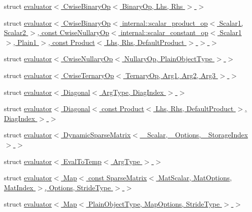 \begin{DoxyCompactItemize}
\item 
struct \hyperlink{struct_eigen_1_1internal_1_1evaluator_3_01_cwise_binary_op_3_01_binary_op_00_01_lhs_00_01_rhs_01_4_01_4}{evaluator$<$ Cwise\+Binary\+Op$<$ Binary\+Op, Lhs, Rhs $>$ $>$}
\item 
struct \hyperlink{struct_eigen_1_1internal_1_1evaluator_3_01_cwise_binary_op_3_01internal_1_1scalar__product__op_321f22566d2663743c7f9d1c3e4e03f69}{evaluator$<$ Cwise\+Binary\+Op$<$ internal\+::scalar\+\_\+product\+\_\+op$<$ Scalar1, Scalar2 $>$, const Cwise\+Nullary\+Op$<$ internal\+::scalar\+\_\+constant\+\_\+op$<$ Scalar1 $>$, Plain1 $>$, const Product$<$ Lhs, Rhs, Default\+Product $>$ $>$ $>$}
\item 
struct \hyperlink{struct_eigen_1_1internal_1_1evaluator_3_01_cwise_nullary_op_3_01_nullary_op_00_01_plain_object_type_01_4_01_4}{evaluator$<$ Cwise\+Nullary\+Op$<$ Nullary\+Op, Plain\+Object\+Type $>$ $>$}
\item 
struct \hyperlink{struct_eigen_1_1internal_1_1evaluator_3_01_cwise_ternary_op_3_01_ternary_op_00_01_arg1_00_01_arg2_00_01_arg3_01_4_01_4}{evaluator$<$ Cwise\+Ternary\+Op$<$ Ternary\+Op, Arg1, Arg2, Arg3 $>$ $>$}
\item 
struct \hyperlink{struct_eigen_1_1internal_1_1evaluator_3_01_diagonal_3_01_arg_type_00_01_diag_index_01_4_01_4}{evaluator$<$ Diagonal$<$ Arg\+Type, Diag\+Index $>$ $>$}
\item 
struct \hyperlink{struct_eigen_1_1internal_1_1evaluator_3_01_diagonal_3_01const_01_product_3_01_lhs_00_01_rhs_00_0f2daf8d0d705abfd9eae463424f3e8d5}{evaluator$<$ Diagonal$<$ const Product$<$ Lhs, Rhs, Default\+Product $>$, Diag\+Index $>$ $>$}
\item 
struct \hyperlink{struct_eigen_1_1internal_1_1evaluator_3_01_dynamic_sparse_matrix_3_01___scalar_00_01___options_00_01___storage_index_01_4_01_4}{evaluator$<$ Dynamic\+Sparse\+Matrix$<$ \+\_\+\+Scalar, \+\_\+\+Options, \+\_\+\+Storage\+Index $>$ $>$}
\item 
struct \hyperlink{struct_eigen_1_1internal_1_1evaluator_3_01_eval_to_temp_3_01_arg_type_01_4_01_4}{evaluator$<$ Eval\+To\+Temp$<$ Arg\+Type $>$ $>$}
\item 
struct \hyperlink{struct_eigen_1_1internal_1_1evaluator_3_01_map_3_01const_01_sparse_matrix_3_01_mat_scalar_00_01_0f7d77d8dc2e7e7ccd8fbd3de5b937dd}{evaluator$<$ Map$<$ const Sparse\+Matrix$<$ Mat\+Scalar, Mat\+Options, Mat\+Index $>$, Options, Stride\+Type $>$ $>$}
\item 
struct \hyperlink{struct_eigen_1_1internal_1_1evaluator_3_01_map_3_01_plain_object_type_00_01_map_options_00_01_stride_type_01_4_01_4}{evaluator$<$ Map$<$ Plain\+Object\+Type, Map\+Options, Stride\+Type $>$ $>$}

\end{DoxyCompactItemize}
